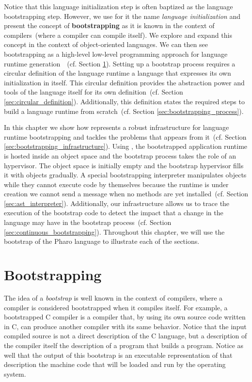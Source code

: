 Notice that this language initialization step is often baptized as the language bootstrapping step. However, we use for it the name \emph{language initialization} and present the concept of \textbf{bootstrapping} as it is known in the context of compilers~(where a compiler can compile itself). We explore and expand this concept in the context of object-oriented languages. We can then see bootstrapping as a high-level low-level programming approach for  language runtime generation~\cite{Fram09a}~(cf. Section \ref{sec:bootstrapping}).
Setting up a bootstrap process requires a circular definition of the language runtime \ie a language that expresses its own initialization in itself. This circular definition provides the abstraction power and tools of the language itself for its own definition~(cf. Section \ref{sec:circular_definition}). Additionally, this definition states the required steps to build a language runtime from scratch~(cf. Section \ref{sec:bootstrapping_process}).

In this chapter we show how \Vtt represents a robust infrastructure for language runtime bootstrapping and tackles the problems that appears from it~(cf. Section \ref{sec:bootstrapping_infrastructure}). Using \Vtt, the bootstrapped application runtime is hosted inside an object space and the bootstrap process takes the role of an hypervisor. The object space is initially empty and the bootstrap hypervisor fills it with objects gradually. A special bootstrapping interpreter manipulates objects while they cannot execute code by themselves because the runtime is under creation \ie we cannot send a message when no methods are yet installed~(cf. Section \ref{sec:ast_interpreter}). Additionally, our infrastructure allows us to trace the execution of the bootstrap code to detect the impact that a change in the language may have in the bootstrap process~(cf. Section \ref{sec:continuous_bootstrapping}). Throughout this chapter, we will use the bootstrap of the Pharo language to illustrate each of the sections.


\section{Bootstrapping}\label{sec:bootstrapping}

The idea of a \emph{bootstrap} is well known in the context of compilers, where a compiler is considered bootstrapped when it compiles itself. For example, a bootstrapped C compiler is a compiler that, by using its own source code written in C, can produce another compiler with its same behavior. Notice that the input compiled source is not a direct description of the C language, but a description of the compiler itself \ie the description of a program that builds a program. Notice as well that the output of this bootstrap is an executable representation of that description \ie the machine code that will be loaded and run by the operating system.


